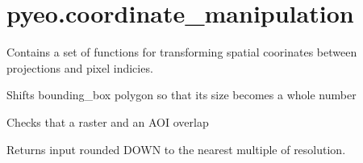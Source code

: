\documentclass[letterpaper,10pt,english]{sphinxmanual}
\begin{document}
\label{\detokenize{index:module-pyeo.coordinate_manipulation}}

\section{pyeo.coordinate\_manipulation}
\label{\detokenize{index:pyeo-coordinate-manipulation}}
Contains a set of functions for transforming spatial coorinates between projections and pixel indicies.

\begin{fulllineitems}
\label{\detokenize{index:pyeo.coordinate_manipulation.align_bounds_to_whole_number}}
Shifts bounding\_box polygon so that its size becomes a whole number

\end{fulllineitems}


\begin{fulllineitems}
\label{\detokenize{index:pyeo.coordinate_manipulation.check_overlap}}
Checks that a raster and an AOI overlap

\end{fulllineitems}


\begin{fulllineitems}
\label{\detokenize{index:pyeo.coordinate_manipulation.floor_to_resolution}}
Returns input rounded DOWN to the nearest multiple of resolution.

\end{fulllineitems}
\end{document}
